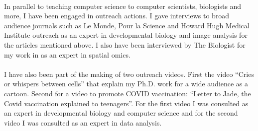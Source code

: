 \paragraph{}In parallel to teaching computer science to computer scientists, biologists and more, I have been engaged in outreach actions.
I gave interviews to broad audience journals such as Le Monde, Pour la Science and Howard Hugh Medical Institute outreach as an expert in developmental biology and image analysis for the articles mentioned above\cite{Guignard2020,McDole:2018aa}.
I also have been interviewed by The Biologist for my work in\cite{Sampath-Kuma:2022aa} as an expert in spatial omics.
\paragraph{}I have also been part of the making of two outreach videos. First the video ``Cries or whispers between cells'' that explain my Ph.D. work for a wide audience as a cartoon. Second for a video to promote COVID vaccination: ``Letter to Jade, the Covid vaccination explained to teenagers''.
For the first video I was consulted as an expert in developmental biology and computer science and for the second video I was consulted as an expert in data analysis.
